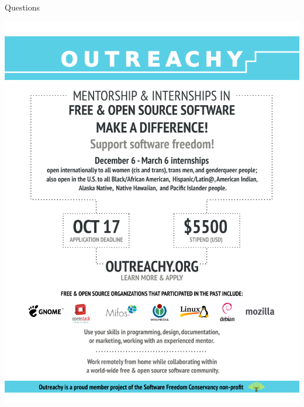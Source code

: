 \documentclass[pdf]{beamer}
\begin{document}
\begin{frame}{Questions}
  \begin{center}
    \includegraphics[scale=0.3]{img/outreachy-applicants-2016-December.png}
  \end{center}
\end{frame}
\end{document}
